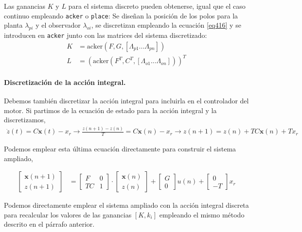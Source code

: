 \documentclass[10pt,a4paper]{report}
\begin{document}
Las ganancias $K$ y $L$ para el sistema discreto pueden obtenerse, igual que el caso continuo empleando \texttt{acker} o \texttt{place}: Se diseñan la posición de los polos para la planta $\lambda_{pi}$ y el observador $\lambda_{oi}$, se discretizan empleando la ecuación \ref{eq416} y se introducen en \texttt{acker} junto con las matrices del sistema discretizado:
\begin{align*}
K &= \text{acker}(F,G,[\Lambda_{p1}...\Lambda_{pn}])\\
L &= \left(\text{acker}(F^T,C^T,[\Lambda_{o1}...\Lambda_{on}])\right)^T
\end{align*}

\paragraph{Discretización de la acción integral.} Debemos también discretizar la acción integral para incluirla en el controlador del motor. Si partimos de la ecuación de estado para la acción integral y la discretizamos,
\begin{align*}
\dot{z}(t) = C \mathbf{x}(t) - x_r \rightarrow \frac{z(n+1)-z(n)}{T}= C \mathbf{x}(n) - x_r \rightarrow z(n+1) = z(n) +TC  \mathbf{x}(n) +Tx_r
\end{align*}

Podemos emplear esta última ecuación directamente para construir el sistema ampliado,

\begin{align}
\begin{bmatrix}
\mathbf{x}(n+1)\\
z(n+1)
\end{bmatrix} &= \begin{bmatrix}
F & 0\\
TC & 1
\end{bmatrix}\cdot\begin{bmatrix}
\mathbf{x}(n)\\
z(n)
\end{bmatrix}+\begin{bmatrix}
G\\
0
\end{bmatrix}u(n) + \begin{bmatrix}
0\\
-T
\end{bmatrix}x_r
\end{align}  

Podemos directamente emplear el sistema ampliado con la acción integral discreta para recalcular los valores de las ganancias $[K,k_i]$ empleando el mismo método descrito en el párrafo anterior.
\end{document}

